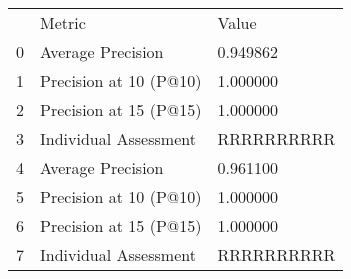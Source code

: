 \begin{tabular}{lll}
 & Metric & Value \\
0 & Average Precision & 0.949862 \\
1 & Precision at 10 (P@10) & 1.000000 \\
2 & Precision at 15 (P@15) & 1.000000 \\
3 & Individual Assessment & RRRRRRRRRR \\
4 & Average Precision & 0.961100 \\
5 & Precision at 10 (P@10) & 1.000000 \\
6 & Precision at 15 (P@15) & 1.000000 \\
7 & Individual Assessment & RRRRRRRRRR \\
\end{tabular}
